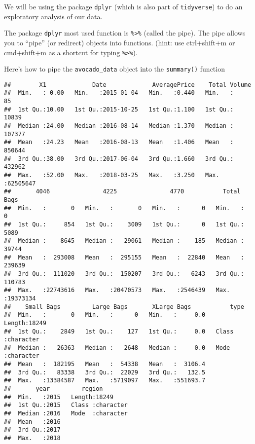 \documentclass[]{book}
\newenvironment{Shaded}{\begin{snugshade}}{\end{snugshade}}
\newcommand{\CommentTok}[1]{\textcolor[rgb]{0.56,0.35,0.01}{\textit{#1}}}
\newcommand{\KeywordTok}[1]{\textcolor[rgb]{0.13,0.29,0.53}{\textbf{#1}}}
\newcommand{\NormalTok}[1]{#1}
\newcommand{\OperatorTok}[1]{\textcolor[rgb]{0.81,0.36,0.00}{\textbf{#1}}}
\newcommand{\StringTok}[1]{\textcolor[rgb]{0.31,0.60,0.02}{#1}}
\begin{document}
We will be using the package \texttt{dplyr} (which is also part of \texttt{tidyverse}) to do an exploratory analysis of our data.

The package \texttt{dplyr} most used function is \texttt{\%\textgreater{}\%} (called the pipe). The pipe allows you to ``pipe'' (or redirect) objects into functions. (hint: use ctrl+shift+m or cmd+shift+m as a shortcut for typing \texttt{\%\textgreater{}\%}).

Here's how to pipe the \texttt{avocado\_data} object into the \texttt{summary()} function

\begin{Shaded}
\end{Shaded}

\begin{verbatim}
##        X1             Date             AveragePrice    Total Volume     
##  Min.   : 0.00   Min.   :2015-01-04   Min.   :0.440   Min.   :      85  
##  1st Qu.:10.00   1st Qu.:2015-10-25   1st Qu.:1.100   1st Qu.:   10839  
##  Median :24.00   Median :2016-08-14   Median :1.370   Median :  107377  
##  Mean   :24.23   Mean   :2016-08-13   Mean   :1.406   Mean   :  850644  
##  3rd Qu.:38.00   3rd Qu.:2017-06-04   3rd Qu.:1.660   3rd Qu.:  432962  
##  Max.   :52.00   Max.   :2018-03-25   Max.   :3.250   Max.   :62505647  
##       4046               4225               4770           Total Bags      
##  Min.   :       0   Min.   :       0   Min.   :      0   Min.   :       0  
##  1st Qu.:     854   1st Qu.:    3009   1st Qu.:      0   1st Qu.:    5089  
##  Median :    8645   Median :   29061   Median :    185   Median :   39744  
##  Mean   :  293008   Mean   :  295155   Mean   :  22840   Mean   :  239639  
##  3rd Qu.:  111020   3rd Qu.:  150207   3rd Qu.:   6243   3rd Qu.:  110783  
##  Max.   :22743616   Max.   :20470573   Max.   :2546439   Max.   :19373134  
##    Small Bags         Large Bags       XLarge Bags           type          
##  Min.   :       0   Min.   :      0   Min.   :     0.0   Length:18249      
##  1st Qu.:    2849   1st Qu.:    127   1st Qu.:     0.0   Class :character  
##  Median :   26363   Median :   2648   Median :     0.0   Mode  :character  
##  Mean   :  182195   Mean   :  54338   Mean   :  3106.4                     
##  3rd Qu.:   83338   3rd Qu.:  22029   3rd Qu.:   132.5                     
##  Max.   :13384587   Max.   :5719097   Max.   :551693.7                     
##       year         region         
##  Min.   :2015   Length:18249      
##  1st Qu.:2015   Class :character  
##  Median :2016   Mode  :character  
##  Mean   :2016                     
##  3rd Qu.:2017                     
##  Max.   :2018
\end{verbatim}
\end{document}
